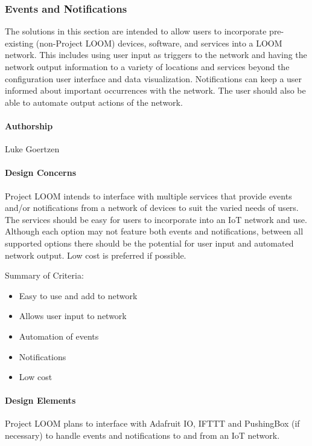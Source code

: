 \documentclass[onecolumn, draftclsnofoot,10pt, compsoc]{IEEEtran}
\begin{document}
\subsubsection{Events and Notifications}
    The solutions in this section are intended to allow users to incorporate pre-existing (non-Project LOOM) devices, software, and services into a LOOM network. This includes using user input as triggers to the network and having the network output information to a variety of locations and services beyond the configuration user interface and data visualization. Notifications can keep a user informed about important occurrences with the network. The user should also be able to automate output actions of the network.

\paragraph{Authorship}
    Luke Goertzen

\paragraph{Design Concerns}
    Project LOOM intends to interface with multiple services that provide events and/or notifications from a network of devices to suit the varied needs of users. The services should be easy for users to incorporate into an IoT network and use. Although each option may not feature both events and notifications, between all supported options there should be the potential for user input and automated network output. Low cost is preferred if possible.

    Summary of Criteria:
    \begin{itemize}[noitemsep,topsep=-10pt]
        \item Easy to use and add to network
        \item Allows user input to network
        \item Automation of events
        \item Notifications
        \item Low cost
    \end{itemize}

\paragraph{Design Elements}
    Project LOOM plans to interface with Adafruit IO, IFTTT and PushingBox (if necessary) to handle events and notifications to and from an IoT network.
\end{document}
